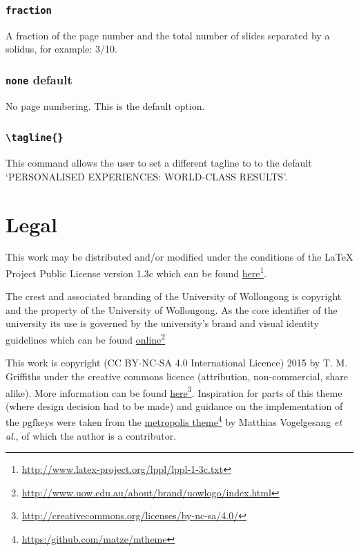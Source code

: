 \documentclass[a4paper,oneside,11pt]{article}
\newcommand{\val}[1]{\texttt{\color{UOWblue}#1}}
\newcommand{\command}[1]{\texttt{\color{UOWdarkgreen}#1}}
\begin{document}
\subsubsection*{\val{fraction}}
A fraction of the page number and the total number of slides separated by a solidus, for example: 3/10.

\subsubsection*{\val{none} default}
No page numbering. This is the default option.

\subsubsection*{\command{\textbackslash{}tagline\{\}}}
This command allows the user to set a different tagline to to the default `PERSONALISED EXPERIENCES: WORLD-CLASS RESULTS'.

\section{Legal}
This work may be distributed and/or modified under the conditions of the LaTeX Project Public License version 1.3c which can be found \href{http://www.latex-project.org/lppl/lppl-1-3c.txt}{here}\footnote{\url{http://www.latex-project.org/lppl/lppl-1-3c.txt}}.

The crest and associated branding of the University of Wollongong is copyright and the property of the University of Wollongong. As the core identifier of the university its use is governed by the university's brand and visual identity guidelines which can be found \href{http://www.uow.edu.au/about/brand/uowlogo/index.html}{online}\footnote{\url{http://www.uow.edu.au/about/brand/uowlogo/index.html}}

This work is copyright (CC BY-NC-SA 4.0 International Licence) 2015 by T. M. Griffiths under the creative commons licence (attribution, non-commercial, share alike). More information can be found \href{http://creativecommons.org/licenses/by-nc-sa/4.0/}{here}\footnote{\url{http://creativecommons.org/licenses/by-nc-sa/4.0/}}. Inspiration for parts of this theme (where design decision had to be made) and guidance on the implementation of the pgfkeys were taken from the \href{https:/github.com/matze/mtheme}{metropolis theme}\footnote{\url{https:/github.com/matze/mtheme}} by Matthias Vogelgesang \textit{et al}., of which the author is a contributor. 
\end{document}
